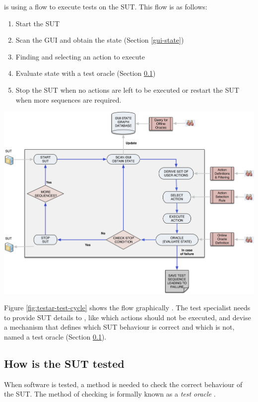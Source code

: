 \testar is using a flow to execute tests on the SUT. This flow is as follows:
\begin{samepage}
\begin{enumerate}
    \item Start the SUT
    \item Scan the GUI and obtain the state (Section \ref{gui-state})
    \item Finding and selecting an action to execute
    \item Evaluate state with a test oracle (Section \ref{test-oracles})
    \item Stop the SUT when no actions are left to be executed or restart the SUT when more sequences are required.
\end{enumerate}
\end{samepage}

\bigskip
\begingroup
\captionsetup{type=figure}
\includegraphics[scale=0.36]{images/testar-test-cycle.png}
\label{fig:testar-test-cycle}
\endgroup

Figure \ref{fig:testar-test-cycle} shows the flow graphically \cite{VosAho2021}. The test specialist needs to provide SUT details to \testar, like which actions should not be executed, and devise a mechanism that defines which SUT behaviour is correct and which is not, named a test oracle (Section \ref{test-oracles}). 

\subsection{How is the SUT tested} \label{test-oracles}
When software is tested, a method is needed to check the correct behaviour of the SUT. The method of checking is formally known as a \emph{test oracle} \cite{testOracles}. 

